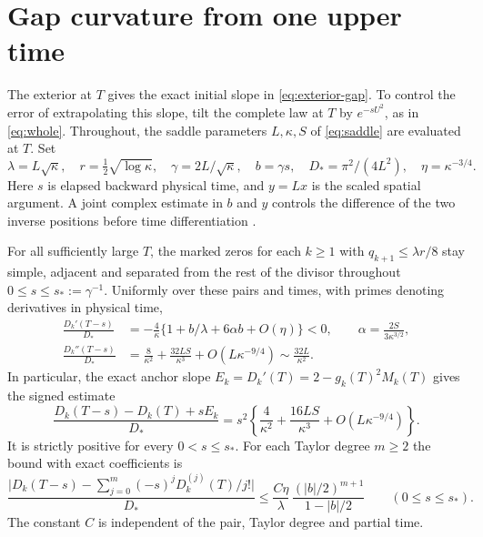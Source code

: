 \section{Gap curvature from one upper time}\label{sec:anchored-curvature}

The exterior at \(T\) gives the exact initial slope in \eqref{eq:exterior-gap}.
To control the error of extrapolating this slope, tilt the complete law at
\(T\) by \(e^{-sU^2}\), as in \eqref{eq:whole}. Throughout, the saddle
parameters \(L,\kappa,S\) of \eqref{eq:saddle} are evaluated at \(T\).
Set
\[
 \lambda=L\sqrt\kappa,\quad r=\tfrac12\sqrt{\log\kappa},\quad
 \gamma=2L/\sqrt\kappa,\quad b=\gamma s,\quad
 D_*=\pi^2/(4L^2),\quad \eta=\kappa^{-3/4} .
\]
Here \(s\) is elapsed backward physical time, and \(y=Lx\) is the scaled
spatial argument. A joint complex estimate in \(b\) and \(y\) controls the
difference of the two inverse positions before time differentiation
\cite{EZCurvature}.

\begin{theorem}\label{thm:anchored-curvature}
For all sufficiently large \(T\), the marked zeros for each \(k\ge1\) with
\(q_{k+1}\le\lambda r/8\) stay simple, adjacent and separated from the rest
of the divisor throughout \(0\le s\le s_*:=\gamma^{-1}\). Uniformly over
these pairs and times, with primes denoting derivatives in physical time,
\begin{align}
 \frac{D_k'(T-s)}{D_*}
   &=-\frac4\kappa\{1+b/\lambda+6\alpha b+O(\eta)\}<0,
      \qquad \alpha=\frac{2S}{3\kappa^{3/2}},\label{eq:anchored-slope}\\
 \frac{D_k''(T-s)}{D_*}
   &=\frac8{\kappa^2}+\frac{32LS}{\kappa^3}+O(L\kappa^{-9/4})
     \sim\frac{32L}{\kappa^2}.\label{eq:anchored-curvature}
\end{align}
In particular, the exact anchor slope \(E_k=D_k'(T)=2-g_k(T)^2M_k(T)\)
gives the signed estimate
\begin{equation}\label{eq:anchored-linear}
 \frac{D_k(T-s)-D_k(T)+sE_k}{D_*}
   =s^2\left\{\frac4{\kappa^2}+\frac{16LS}{\kappa^3}
                  +O(L\kappa^{-9/4})\right\} .
\end{equation}
It is strictly positive for every \(0<s\le s_*\).
For each Taylor degree \(m\ge2\) the bound with exact coefficients is
\begin{equation}\label{eq:anchored-taylor}
 \frac{\bigl|D_k(T-s)-\sum_{j=0}^m(-s)^j D_k^{(j)}(T)/j!\bigr|}{D_*}
 \le \frac{C\eta}{\lambda}\,\frac{(|b|/2)^{m+1}}{1-|b|/2}
 \qquad (0\le s\le s_*).
\end{equation}
The constant \(C\) is independent of the pair, Taylor degree and partial time.
\end{theorem}

